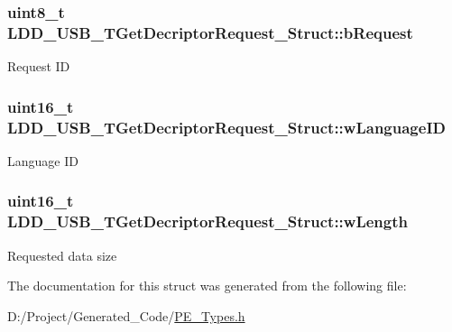 \subsubsection[{b\+Request}]{\setlength{\rightskip}{0pt plus 5cm}uint8\+\_\+t L\+D\+D\+\_\+\+U\+S\+B\+\_\+\+T\+Get\+Decriptor\+Request\+\_\+\+Struct\+::b\+Request}\label{struct_l_d_d___u_s_b___t_get_decriptor_request___struct_aa7651472aa5110086f335c0b79c0bc5b}
Request I\+D \hypertarget{struct_l_d_d___u_s_b___t_get_decriptor_request___struct_a228c41af26c45c1fa18d964c0702a4b4}{}
\subsubsection[{w\+Language\+I\+D}]{\setlength{\rightskip}{0pt plus 5cm}uint16\+\_\+t L\+D\+D\+\_\+\+U\+S\+B\+\_\+\+T\+Get\+Decriptor\+Request\+\_\+\+Struct\+::w\+Language\+I\+D}\label{struct_l_d_d___u_s_b___t_get_decriptor_request___struct_a228c41af26c45c1fa18d964c0702a4b4}
Language I\+D \hypertarget{struct_l_d_d___u_s_b___t_get_decriptor_request___struct_af9ac7409b4031aa6f3ec5da9d79b06eb}{}
\subsubsection[{w\+Length}]{\setlength{\rightskip}{0pt plus 5cm}uint16\+\_\+t L\+D\+D\+\_\+\+U\+S\+B\+\_\+\+T\+Get\+Decriptor\+Request\+\_\+\+Struct\+::w\+Length}\label{struct_l_d_d___u_s_b___t_get_decriptor_request___struct_af9ac7409b4031aa6f3ec5da9d79b06eb}
Requested data size 

The documentation for this struct was generated from the following file\+:\begin{DoxyCompactItemize}
\item 
D\+:/\+Project/\+Generated\+\_\+\+Code/\hyperlink{_p_e___types_8h}{P\+E\+\_\+\+Types.\+h}\end{DoxyCompactItemize}
